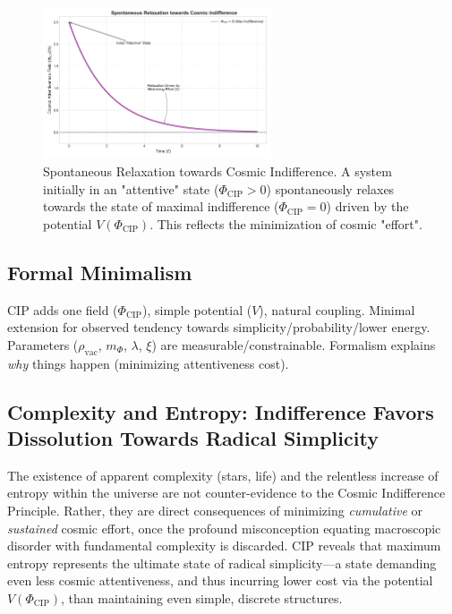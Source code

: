 \documentclass[11pt, a4paper]{article}
\newcommand{\subt}[1]{\mathrm{#1}}
\begin{document}
\begin{figure}[H]
    \centering
    \includegraphics[width=0.6\textwidth]{CIP_Relaxation.png}
    \caption[Spontaneous Relaxation towards Cosmic Indifference]{Spontaneous Relaxation towards Cosmic Indifference. A system initially in an "attentive" state ($\Phi_{\subt{CIP}} > 0$) spontaneously relaxes towards the state of maximal indifference ($\Phi_{\subt{CIP}} = 0$) driven by the potential $V(\Phi_{\subt{CIP}})$. This reflects the minimization of cosmic "effort".}
    \label{fig:relaxation}
\end{figure}

\subsection{Formal Minimalism}

CIP adds one field ($\Phi_{\subt{CIP}}$), simple potential ($V$), natural coupling. Minimal extension for observed tendency towards simplicity/probability/lower energy. Parameters ($\rho_{\subt{vac}}$, $m_{\Phi}$, $\lambda$, $\xi$) are measurable/constrainable. Formalism explains \textit{why} things happen (minimizing attentiveness cost).

\subsection{Complexity and Entropy: Indifference Favors Dissolution Towards Radical Simplicity} \label{sec:entropy_complexity}

The existence of apparent complexity (stars, life) and the relentless increase of entropy within the universe are not counter-evidence to the Cosmic Indifference Principle. Rather, they are direct consequences of minimizing \textit{cumulative} or \textit{sustained} cosmic effort, once the profound misconception equating macroscopic disorder with fundamental complexity is discarded. CIP reveals that maximum entropy represents the ultimate state of radical simplicity—a state demanding even less cosmic attentiveness, and thus incurring lower cost via the potential $V(\Phi_{\subt{CIP}})$, than maintaining even simple, discrete structures.
\end{document}
